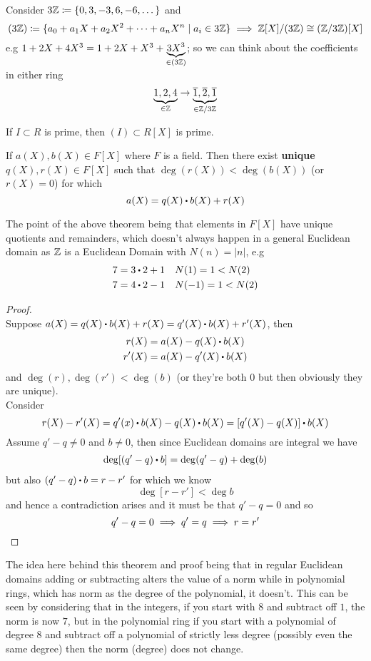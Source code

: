 \documentclass[../Main.tex]{subfiles}
\begin{document}
\begin{example}
	Consider $3\mathbb{Z} \coloneqq \{0,3,-3,6,-6,\dots\}$ and
	\[(3\mathbb{Z})\coloneqq \{a_0+a_1X+a_2X^2+\dots+a_nX^n\mid a_i\in 3\mathbb{Z}\} \implies \mathbb{Z}[X]/(3\mathbb{Z})\cong (\mathbb{Z}/3\mathbb{Z})[X]\]
	e.g $1+2X+4X^3=1+2X+X^3+\underbrace{3X^3}_{\in (3\mathbb{Z})}$; so we can think about the coefficients in either ring
	\[\underbrace{1,2,4}_{\in \mathbb{Z}}\to \underbrace{\overline{1},\overline{2},\overline{1}}_{\in \mathbb{Z}/3\mathbb{Z}}\]
\end{example}
\begin{crl}
		If $I\subset R$ is prime, then $(I)\subset R[X]$ is prime.
\end{crl}

\begin{thm}[title = \texorpdfstring{$F[X]$}{F[X]} satisfies unique euclidean condition,label=12.8]
	If $a(X),b(X)\in F[X]$ where $F$ is a field. Then there exist \textbf{unique} $q(X),r(X)\in F[X]$ such that $\deg (r(X)) < \deg (b(X))$ (or $r(X)=0$) for which \[a(X)=q(X)\rdot b(X)+r(X)\]
\end{thm}
\Note The point of the above theorem being that elements in $F[X]$ have unique quotients and remainders, which doesn't always happen in a general Euclidean domain as $\mathbb{Z}$ is a Euclidean Domain with $N(n)=|n|$, e.g
\begin{align*}
7=3\rdot 2+1&\quad N(1)=1<N(2)\\
7=4\rdot 2-1&\quad N(-1)=1<N(2)
\end{align*}
\begin{proof}~\\
	Suppose $a(X)=q(X)\rdot b(X)+r(X)=q'(X)\rdot b(X)+r'(X)$, then
	\begin{align*}
	r(X)&=a(X)-q(X)\rdot b(X)\\
	r'(X)&=a(X)-q'(X)\rdot b(X)
	\end{align*}
	and $\deg(r),\deg(r')<\deg(b)$ (or they're both $0$ but then obviously they are unique).\\
	Consider
	\[r(X)-r'(X)=q'(x)\rdot b(X)-q(X)\rdot b(X) = [q'(X)-q(X)]\rdot b(X)\]
	Assume $q'-q\ne 0$ and $b\ne 0$, then since Euclidean domains are integral 	we have
	\begin{align*}
	\deg[(q'-q)\rdot b]=\deg(q'-q)+\deg(b)
	\end{align*}
	but also $(q'-q)\rdot b = r-r'$ for which we know
	\[\deg[r-r']<\deg b\]
	and hence a contradiction arises and it must be that $q'-q=0$ and so \[q'-q=0\implies q'=q\implies r=r'\qedhere\]
\end{proof}
The idea here behind this theorem and proof being that in regular Euclidean domains adding or subtracting alters the value of a norm while in polynomial rings, which has norm as the degree of the polynomial, it doesn't. This can be seen by considering that in the integers, if you start with $8$ and subtract off $1$, the norm is now $7$, but in the polynomial ring if you start with a polynomial of degree $8$ and subtract off a polynomial of strictly less degree (possibly even the same degree) then the norm (degree) does not change.
\end{document}
